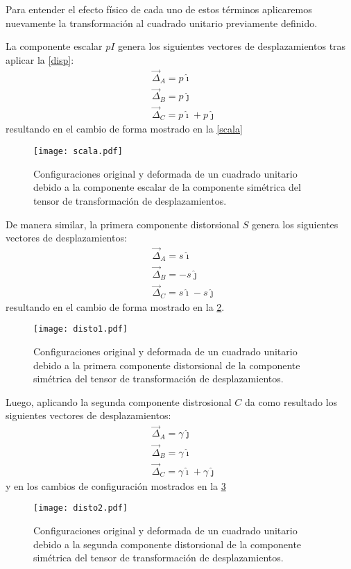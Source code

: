 \documentclass[../notas medios.tex]{subfiles}
\begin{document}
Para entender el efecto físico de cada uno de estos términos aplicaremos nuevamente la transformación al cuadrado unitario previamente definido.

La componente escalar $pI$ genera los siguientes vectores de desplazamientos 
tras aplicar la \cref{disp}:
\begin{align*}
&\vec{\Delta}_A = p\hat \imath\\
&\vec{\Delta}_B = p\hat \jmath\\
&\vec{\Delta}_C = p\hat \imath + p\hat \jmath
\end{align*}
resultando en el cambio de forma mostrado en la \cref{scala}

\begin{figure}[H]
\centering
	\texttt{[image: scala.pdf]}
	\caption{Configuraciones original y deformada de un cuadrado unitario debido a la componente escalar de la componente simétrica del tensor de transformación de desplazamientos.}
	\label{escalar}
\end{figure}

De manera similar, la primera componente distorsional $S$ genera los siguientes 
vectores de desplazamientos:
\begin{align*}
&\vec{\Delta}_A = s\hat \imath\\
&\vec{\Delta}_B =  - s\hat \jmath\\
&\vec{\Delta}_C = s\hat \imath - s\hat \jmath
\end{align*}
resultando en el cambio de forma mostrado en la \cref{disto1}.

\begin{figure}[H]
\centering
	\texttt{[image: disto1.pdf]}
	\caption{Configuraciones original y deformada de un cuadrado unitario debido a la primera componente distorsional de la componente simétrica del tensor de transformación de desplazamientos.}
	\label{disto1}
\end{figure}

Luego, aplicando la segunda componente distrosional $C$ da como resultado los siguientes vectores de desplazamientos:
\begin{align*}
&\vec{\Delta}_A = \gamma \hat \jmath\\
&\vec{\Delta}_B = \gamma \hat \imath\\
&\vec{\Delta}_C = \gamma \hat \imath + \gamma \hat \jmath
\end{align*}
y en los cambios de configuración mostrados en la \cref{disto2}
\begin{figure}[H]
\centering
	\texttt{[image: disto2.pdf]}
	\caption{Configuraciones original y deformada de un cuadrado unitario debido a la segunda componente distorsional de la componente simétrica del tensor de transformación de desplazamientos.}
	\label{disto2}
\end{figure}
\end{document}
